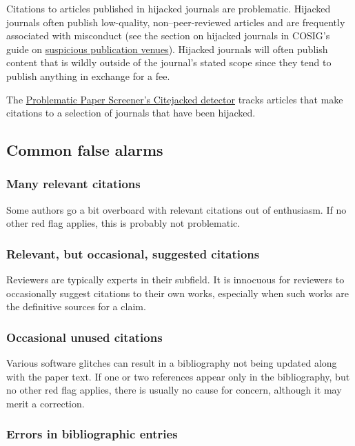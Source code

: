 \documentclass[letterpaper, 12pt]{article}
\begin{document}
Citations to articles published in hijacked journals are problematic. Hijacked journals often publish low-quality, non–peer-reviewed articles and are frequently associated with  misconduct (see the section on hijacked journals in COSIG's guide on \href{https://osf.io/vrk7e}{suspicious publication venues}). Hijacked journals will often publish content that is wildly outside of the journal's stated scope since they tend to publish anything in exchange for a fee.

The \href{https://www.irit.fr/~Guillaume.Cabanac/problematic-paper-screener/citejacked}{Problematic Paper Screener's Citejacked detector} tracks articles that make citations to a selection of journals that have been hijacked.

\subsection*{Common false alarms}

\subsubsection*{Many relevant citations}

Some authors go a bit overboard with
relevant citations out of enthusiasm. If no other red flag applies,
this is probably not problematic.

\subsubsection*{Relevant, but occasional, suggested citations}

Reviewers are typically experts in their subfield. It is innocuous for reviewers to occasionally suggest citations to their own works, especially when such works are the definitive sources for a claim.

\subsubsection*{Occasional unused citations}

Various software glitches can result in a bibliography not being updated along with the paper text.
If one or two references appear only in the bibliography, but no other red flag applies, there is usually no cause for concern, although it may merit a correction.

\subsubsection*{Errors in bibliographic entries}
\end{document}
